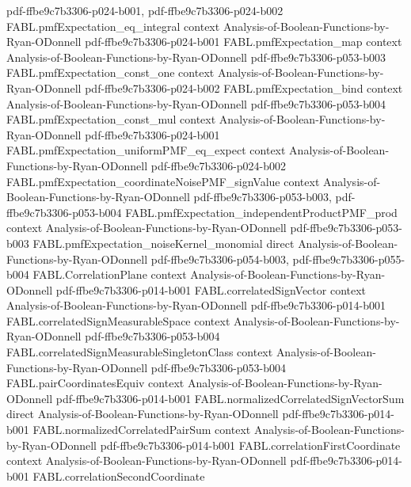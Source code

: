 \begin{theorem}
  {pdf-ffbe9c7b3306-p024-b001,
    pdf-ffbe9c7b3306-p024-b002}
\proofstep
  {FABL.pmfExpectation_eq_integral}
  {context}
  {Analysis-of-Boolean-Functions-by-Ryan-ODonnell}
  {pdf-ffbe9c7b3306-p024-b001}
\proofstep
  {FABL.pmfExpectation_map}
  {context}
  {Analysis-of-Boolean-Functions-by-Ryan-ODonnell}
  {pdf-ffbe9c7b3306-p053-b003}
\proofstep
  {FABL.pmfExpectation_const_one}
  {context}
  {Analysis-of-Boolean-Functions-by-Ryan-ODonnell}
  {pdf-ffbe9c7b3306-p024-b002}
\proofstep
  {FABL.pmfExpectation_bind}
  {context}
  {Analysis-of-Boolean-Functions-by-Ryan-ODonnell}
  {pdf-ffbe9c7b3306-p053-b004}
\proofstep
  {FABL.pmfExpectation_const_mul}
  {context}
  {Analysis-of-Boolean-Functions-by-Ryan-ODonnell}
  {pdf-ffbe9c7b3306-p024-b001}
\proofstep
  {FABL.pmfExpectation_uniformPMF_eq_expect}
  {context}
  {Analysis-of-Boolean-Functions-by-Ryan-ODonnell}
  {pdf-ffbe9c7b3306-p024-b002}
\proofstep
  {FABL.pmfExpectation_coordinateNoisePMF_signValue}
  {context}
  {Analysis-of-Boolean-Functions-by-Ryan-ODonnell}
  {pdf-ffbe9c7b3306-p053-b003,
    pdf-ffbe9c7b3306-p053-b004}
\proofstep
  {FABL.pmfExpectation_independentProductPMF_prod}
  {context}
  {Analysis-of-Boolean-Functions-by-Ryan-ODonnell}
  {pdf-ffbe9c7b3306-p053-b003}
\proofstep
  {FABL.pmfExpectation_noiseKernel_monomial}
  {direct}
  {Analysis-of-Boolean-Functions-by-Ryan-ODonnell}
  {pdf-ffbe9c7b3306-p054-b003,
    pdf-ffbe9c7b3306-p055-b004}
\proofstep
  {FABL.CorrelationPlane}
  {context}
  {Analysis-of-Boolean-Functions-by-Ryan-ODonnell}
  {pdf-ffbe9c7b3306-p014-b001}
\proofstep
  {FABL.correlatedSignVector}
  {context}
  {Analysis-of-Boolean-Functions-by-Ryan-ODonnell}
  {pdf-ffbe9c7b3306-p014-b001}
\proofstep
  {FABL.correlatedSignMeasurableSpace}
  {context}
  {Analysis-of-Boolean-Functions-by-Ryan-ODonnell}
  {pdf-ffbe9c7b3306-p053-b004}
\proofstep
  {FABL.correlatedSignMeasurableSingletonClass}
  {context}
  {Analysis-of-Boolean-Functions-by-Ryan-ODonnell}
  {pdf-ffbe9c7b3306-p053-b004}
\proofstep
  {FABL.pairCoordinatesEquiv}
  {context}
  {Analysis-of-Boolean-Functions-by-Ryan-ODonnell}
  {pdf-ffbe9c7b3306-p014-b001}
\proofstep
  {FABL.normalizedCorrelatedSignVectorSum}
  {direct}
  {Analysis-of-Boolean-Functions-by-Ryan-ODonnell}
  {pdf-ffbe9c7b3306-p014-b001}
\proofstep
  {FABL.normalizedCorrelatedPairSum}
  {context}
  {Analysis-of-Boolean-Functions-by-Ryan-ODonnell}
  {pdf-ffbe9c7b3306-p014-b001}
\proofstep
  {FABL.correlationFirstCoordinate}
  {context}
  {Analysis-of-Boolean-Functions-by-Ryan-ODonnell}
  {pdf-ffbe9c7b3306-p014-b001}
\proofstep
  {FABL.correlationSecondCoordinate}

\end{theorem}
